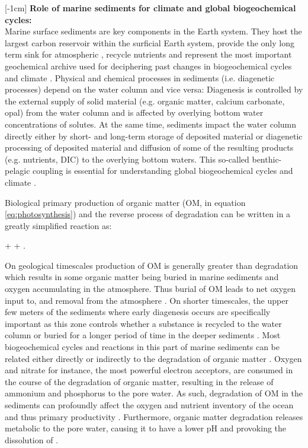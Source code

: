 \documentclass[gmd, manuscript]{copernicus}
\begin{document}
[-1cm]%
\textbf{Role of marine sediments for climate and global biogeochemical cycles:}\\
Marine surface sediments are key components in the Earth system. They host the largest carbon reservoir within the surficial Earth system, provide the only long term sink for atmospheric , 
recycle nutrients and represent the most important geochemical archive used for deciphering past changes in biogeochemical cycles and climate  \citep[e.g.][]{berner:91, archer_effect_1994, ridgwell_role_2005, arndt_quantifying_2013}. 
Physical and chemical processes in sediments (i.e. diagenetic processes) depend on the water column and vice versa: Diagenesis is controlled by the external supply of solid material 
(e.g. organic matter, calcium carbonate, opal) from the water column and is affected by overlying bottom water concentrations of solutes. 
At the same time, sediments impact the water column directly either by short- and long-term storage of deposited material or diagenetic processing of deposited material and 
diffusion of some of the resulting products (e.g. nutrients, DIC) to the overlying bottom waters. 
This so-called benthic-pelagic coupling is essential for understanding global biogeochemical cycles and climate \citep[e.g.][]{archer_effect_1994, archer_what_2000, soetaert_coupling_2000, mackenzie_sediments_2005}. 

Biological primary production of organic matter (OM,  in equation \ref{eq:photosynthesis}) and the reverse process of degradation can be written in a greatly simplified reaction as:
\begin{reaction}
+ \rightleftharpoons {} + .\label{eq:photosynthesis}
\end{reaction}
On geological timescales production of OM is generally greater than degradation which results in some organic matter being buried in marine sediments and oxygen accumulating in the atmosphere. 
Thus burial of OM leads to net oxygen input to, and  removal from the atmosphere \citep{berner_phanerozoic_2004}. 
On shorter timescales, the upper few meters of the sediments where early diagenesis occurs are specifically important as this zone controls whether a substance is recycled 
to the water column or buried for a longer period of time in the deeper sediments \citep{hensen_benthic_2006}. 
Most biogeochemical cycles and reactions in this part of marine sediments can be related either directly or indirectly to the degradation of organic matter \citep[][]{arndt_quantifying_2013}. 
Oxygen and nitrate for instance, the most powerful electron acceptors, are consumed in the course of the degradation of organic matter, resulting in the release of ammonium and phosphorus to the pore water. 
As such, degradation of OM in the sediments can profoundly affect the oxygen and nutrient inventory of the ocean and thus primary productivity \citep{van_cappellen_benthic_1994, lenton_redfield_2000}. 
Furthermore, organic matter degradation releases metabolic  to the pore water, causing it to have a lower pH and provoking the dissolution of  \citep{emerson_carbon_1981}.
\end{document}
